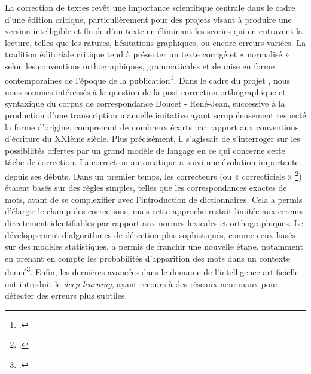 La correction de textes revêt une importance scientifique centrale dans le cadre d’une édition critique, particulièrement pour des projets visant à produire une version intelligible et fluide d’un texte en éliminant les scories qui en entravent la lecture, telles que les ratures, hésitations graphiques, ou encore erreurs variées. La tradition éditoriale critique tend à présenter un texte corrigé et « normalisé » selon les conventions orthographiques, grammaticales et de mise en forme contemporaines de l’époque de la publication\footcite{nougaret_ledition_2015}. Dans le cadre du projet \pense, nous nous sommes intéressés à la question de la post-correction orthographique et syntaxique du corpus de correspondance Doucet - René-Jean, successive à la production d’une transcription manuelle imitative ayant scrupuleusement respecté la forme d’origine, comprenant de nombreux écarts par rapport aux conventions d’écriture du XXIème siècle. Plus précisément, il s’agissait de s’interroger sur les possibilités offertes par un grand modèle de langage en ce qui concerne cette tâche de correction.
La correction automatique a suivi une évolution importante depuis ses débuts. Dans un premier temps, les correcteurs (ou « correcticiels » \footcite{jacquet-pfau_correcteurs_2001}) étaient basés sur des règles simples, telles que les correspondances exactes de mots, avant de se complexifier avec l’introduction de dictionnaires. Cela a permis d’élargir le champ des corrections, mais cette approche restait limitée aux erreurs directement identifiables par rapport aux normes lexicales et orthographiques. Le développement d’algorithmes de détection plus sophistiqués, comme ceux basés sur des modèles statistiques, a permis de franchir une nouvelle étape, notamment en prenant en compte les probabilités d’apparition des mots dans un contexte donné\footcite{mitton_fifty_2010}. Enfin, les dernières avancées dans le domaine de l’intelligence artificielle ont introduit le \textit{deep learning}, ayant recours à des réseaux neuronaux pour détecter des erreurs plus subtiles.

\newline

